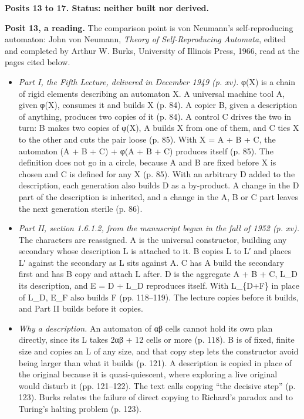 \textbf{Posits 13 to 17. Status: neither built nor derived.}

\textbf{Posit 13, a reading.} The comparison point is von Neumann's self-reproducing automaton: John von Neumann, \emph{Theory of Self-Reproducing Automata}, edited and completed by Arthur W. Burks, University of Illinois Press, 1966, read at the pages cited below.

\begin{itemize}
\item \emph{Part I, the Fifth Lecture, delivered in December 1949 (p. xv).} φ(X) is a chain of rigid elements describing an automaton X. A universal machine tool A, given φ(X), consumes it and builds X (p. 84). A copier B, given a description of anything, produces two copies of it (p. 84). A control C drives the two in turn: B makes two copies of φ(X), A builds X from one of them, and C ties X to the other and cuts the pair loose (p. 85). With X = A + B + C, the automaton (A + B + C) + φ(A + B + C) produces itself (p. 85). The definition does not go in a circle, because A and B are fixed before X is chosen and C is defined for any X (p. 85). With an arbitrary D added to the description, each generation also builds D as a by-product. A change in the D part of the description is inherited, and a change in the A, B or C part leaves the next generation sterile (p. 86).
\item \emph{Part II, section 1.6.1.2, from the manuscript begun in the fall of 1952 (p. xv).} The characters are reassigned. A is the universal constructor, building any secondary whose description L is attached to it. B copies L to L′ and places L′ against the secondary as L sits against A. C has A build the secondary first and has B copy and attach L after. D is the aggregate A + B + C, L\_\allowbreak{}D its description, and E = D + L\_\allowbreak{}D reproduces itself. With L\_\allowbreak{}\{D+F\} in place of L\_\allowbreak{}D, E\_\allowbreak{}F also builds F (pp. 118–119). The lecture copies before it builds, and Part II builds before it copies.
\item \emph{Why a description.} An automaton of αβ cells cannot hold its own plan directly, since its L takes 2αβ + 12 cells or more (p. 118). B is of fixed, finite size and copies an L of any size, and that copy step lets the constructor avoid being larger than what it builds (p. 121). A description is copied in place of the original because it is quasi-quiescent, where exploring a live original would disturb it (pp. 121–122). The text calls copying “the decisive step” (p. 123). Burks relates the failure of direct copying to Richard's paradox and to Turing's halting problem (p. 123).

\end{itemize}
